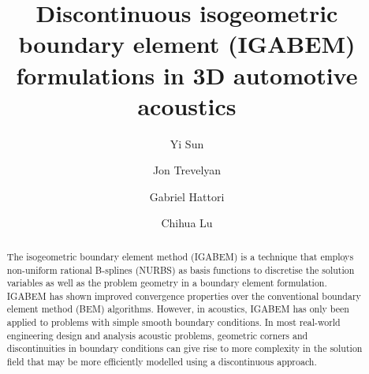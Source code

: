 \documentclass[review]{elsarticle}
\begin{document}
\begin{frontmatter}

\title{Discontinuous isogeometric boundary element (IGABEM) formulations in 3D automotive acoustics}


\author[mymainaddress,mysecondaryaddress,mythirdaddress,myforthaddress]{Yi Sun}

\author[mymainaddress]{Jon Trevelyan}
\author[mymainaddress,myfifthaddress]{Gabriel Hattori}
\author[mysecondaryaddress,mythirdaddress,myforthaddress]{Chihua Lu}

\address[mymainaddress]{Department of Engineering, Durham University, South Road, Durham, UK}
\address[mysecondaryaddress]{School of Automotive Engineering, Wuhan University of Technology, Wuhan 430070, China}
\address[mythirdaddress]{Hubei Key Laboratory of Advanced Technology for Automotive Components (Wuhan University of Technology), Wuhan 430070, China}
\address[myforthaddress]{Hubei Collaborative Innovation Center for Automotive Components Technology (Wuhan University of Technology), Wuhan 430070, China}
\address[myfifthaddress]{Department of Engineering, University of Cambridge, CB2 1PZ, Cambridge, UK}

\begin{abstract}
	
The isogeometric boundary element method (IGABEM) is a technique that employs non-uniform rational B-splines (NURBS) as basis functions to discretise the solution variables as well as the problem geometry in a boundary element formulation. IGABEM has shown improved convergence properties over the conventional boundary element method (BEM) algorithms. However, in acoustics, IGABEM has only been applied to problems with simple smooth boundary conditions. In most real-world engineering design and analysis acoustic problems, geometric corners and discontinuities in boundary conditions can give rise to more complexity in the solution field that may be more efficiently modelled using a discontinuous approach. 


\end{abstract}
\end{frontmatter}
\end{document}
